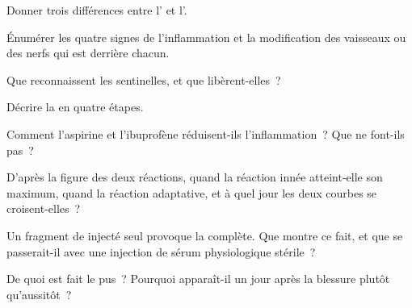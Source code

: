 \begin{exercise}[$\star$]\label{exo:g12:innate-immunity:1}
Donner trois différences entre l' et l'.
\end{exercise}

\begin{exercise}[$\star$]\label{exo:g12:innate-immunity:2}
Énumérer les quatre signes de l'inflammation et la modification des
vaisseaux ou des nerfs qui est derrière chacun.
\end{exercise}

\begin{exercise}[$\star$]\label{exo:g12:innate-immunity:3}
Que reconnaissent les  sentinelles, et que libèrent-elles~?
\end{exercise}

\begin{exercise}[$\star$]\label{exo:g12:innate-immunity:4}
Décrire la  en quatre étapes.
\end{exercise}

\begin{exercise}[$\star$]\label{exo:g12:innate-immunity:5}
Comment l'aspirine et l'ibuprofène réduisent-ils l'inflammation~? Que
ne font-ils pas~?
\end{exercise}

\begin{exercise}[$\star\star$]\label{exo:g12:innate-immunity:6}
D'après la figure des deux réactions, quand la réaction innée
atteint-elle son maximum, quand la réaction adaptative, et à quel jour
les deux courbes se croisent-elles~?
\end{exercise}

\begin{exercise}[$\star\star$]\label{exo:g12:innate-immunity:7}
Un fragment de  injecté seul provoque la  complète. Que montre ce fait, et que se passerait-il
avec une injection de sérum physiologique stérile~?
\end{exercise}

\begin{exercise}[$\star\star$]\label{exo:g12:innate-immunity:8}
De quoi est fait le pus~? Pourquoi apparaît-il un jour après la
blessure plutôt qu'aussitôt~?
\end{exercise}

